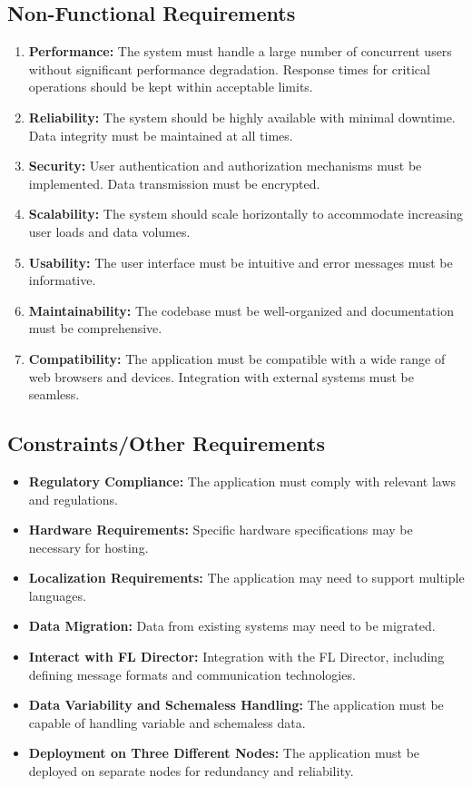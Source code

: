 \subsection{Non-Functional Requirements}

\begin{enumerate}
    \item \textbf{Performance:} The system must handle a large number of concurrent users without significant performance degradation. Response times for critical operations should be kept within acceptable limits.
    \item \textbf{Reliability:} The system should be highly available with minimal downtime. Data integrity must be maintained at all times.
    \item \textbf{Security:} User authentication and authorization mechanisms must be implemented. Data transmission must be encrypted.
    \item \textbf{Scalability:} The system should scale horizontally to accommodate increasing user loads and data volumes.
    \item \textbf{Usability:} The user interface must be intuitive and error messages must be informative.
    \item \textbf{Maintainability:} The codebase must be well-organized and documentation must be comprehensive.
    \item \textbf{Compatibility:} The application must be compatible with a wide range of web browsers and devices. Integration with external systems must be seamless.
\end{enumerate}

\subsection{Constraints/Other Requirements}

\begin{itemize}
    \item \textbf{Regulatory Compliance:} The application must comply with relevant laws and regulations.
    \item \textbf{Hardware Requirements:} Specific hardware specifications may be necessary for hosting.
    \item \textbf{Localization Requirements:} The application may need to support multiple languages.
    \item \textbf{Data Migration:} Data from existing systems may need to be migrated.
    \item \textbf{Interact with FL Director:} Integration with the FL Director, including defining message formats and communication technologies.
    \item \textbf{Data Variability and Schemaless Handling:} The application must be capable of handling variable and schemaless data.
    \item \textbf{Deployment on Three Different Nodes:} The application must be deployed on separate nodes for redundancy and reliability.
\end{itemize}




